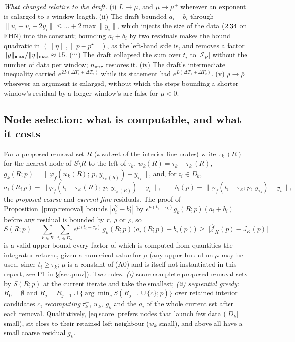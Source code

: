 \documentclass[11pt]{article}
\theoremstyle{remark}\newtheorem{remark}{Remark}
\newcommand{\pstar}{p^\star}
\newcommand{\norm}[1]{\lVert #1\rVert}
\newcommand{\flow}[3]{\varphi_f(#1;\,#2,\,#3)}
\newcommand{\hatJ}{\hat{\mathcal J}}
\begin{document}
\emph{What changed relative to the draft.} (i) $L\to\mu$, and $\mu\to\mu^{+}$ wherever an exponent is enlarged to a window length. (ii) The draft bounded $a_i+b_i$ through $\norm{u_i+v_i-2y_i}\le\dots+2\max\norm{y_i}$, which injects the size of the data ($2.34$ on FHN) into the constant; bounding $a_i+b_i$ by two residuals makes the bound quadratic in $(\norm\eta,\norm{p-\pstar})$, as the left-hand side is, and removes a factor $\norm y_{\max}/\norm\eta_{\max}\approx\nattractorOverNoise$. (iii) The draft collapsed the sum over $t_i$ to $|\mathcal I_R|$ without the number of data per window; $n_{\max}$ restores it. (iv) The draft's intermediate inequality carried $e^{2L(\Delta T_1+\Delta T_2)}$ while its statement had $e^{L(\Delta T_1+\Delta T_2)}$. (v) $\rho\to\bar\rho$ wherever an argument is enlarged, without which the steps bounding a shorter window's residual by a longer window's are false for $\mu<0$.

\subsection{Node selection: what is computable, and what it costs}\label{sec:nodesel}
For a proposed removal set $R$ (a subset of the interior fine nodes) write $\tau_k^{-}(R)$ for the nearest node of $S\setminus R$ to the left of $\tau_k$, $w_k(R)=\tau_k-\tau_k^{-}(R)$, $g_k(R;p)=\norm{\flow{w_k(R)}{p}{y_{\tau_k^{-}(R)}}-y_{\tau_k}}$, and, for $t_i\in D_k$,
\[
a_i(R;p)=\big\lVert\flow{t_i-\tau_k^{-}(R)}{p}{y_{\tau_k^{-}(R)}}-y_i\big\rVert,
\qquad
b_i(p)=\big\lVert\flow{t_i-\tau_k}{p}{y_{\tau_k}}-y_i\big\rVert ,
\]
the \emph{proposed coarse} and \emph{current fine} residuals. The proof of Proposition~\ref{prop:removal} bounds $|a_i^2-b_i^2|$ by $e^{\mu(t_i-\tau_k)}g_k(R;p)(a_i+b_i)$ before any residual is bounded by $r$, $\rho$ or $\bar\rho$, so
\begin{equation}
S(R;p)=\sum_{k\in R}\ \sum_{t_i\in D_k}
e^{\mu(t_i-\tau_k)}\,g_k(R;p)\,\big(a_i(R;p)+b_i(p)\big)\ \ge\ \big|\hatJ_K(p)-J_K(p)\big|
\label{eq:score}
\end{equation}
is a valid upper bound every factor of which is computed from quantities the integrator returns, given a numerical value for $\mu$ (any upper bound on $\mu$ may be used, since $t_i\ge\tau_k$; $\mu$ is a constant of (A0) and is itself not instantiated in this report, see P1 in \S\ref{sec:prov}). Two rules: \emph{(i)} score complete proposed removal sets by $S(R;p)$ at the current iterate and take the smallest; \emph{(ii)} \emph{sequential greedy}: $R_0=\emptyset$ and $R_j=R_{j-1}\cup\{\arg\min_c S(R_{j-1}\cup\{c\};p)\}$ over retained interior candidates $c$, \emph{recomputing} $\tau_k^{-}$, $w_k$, $g_k$ and the $a_i$ of the whole current set after each removal. Qualitatively, \eqref{eq:score} prefers nodes that launch few data ($|D_k|$ small), sit close to their retained left neighbour ($w_k$ small), and above all have a small coarse residual $g_k$.
\end{document}
